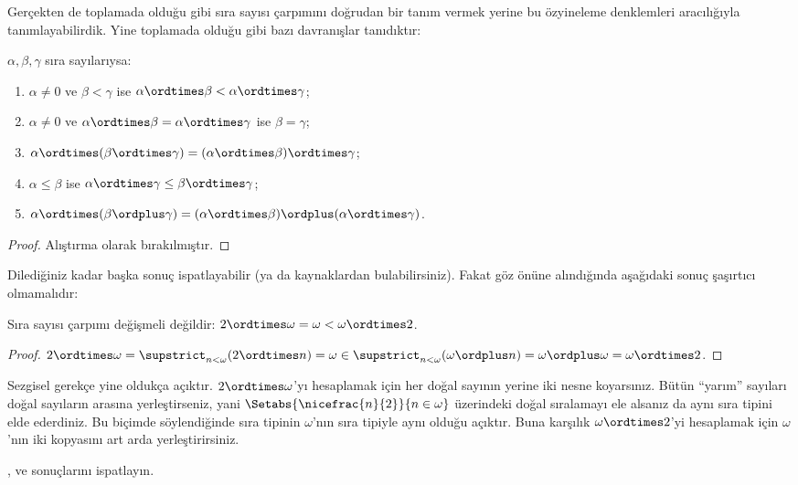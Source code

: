 Gerçekten de toplamada olduğu gibi sıra sayısı çarpımını doğrudan bir tanım
vermek yerine bu özyineleme denklemleri aracılığıyla tanımlayabilirdik.
Yine toplamada olduğu gibi bazı davranışlar tanıdıktır:

\begin{lem}
$\alpha,\beta,\gamma$ sıra sayılarıysa:
\begin{enumerate}
	\item{} $\alpha\neq 0$ ve $\beta<\gamma$ ise
	$\alpha\ordtimes\beta<\alpha\ordtimes\gamma$;
	\item{} $\alpha\neq 0$ ve
	$\alpha\ordtimes\beta=\alpha\ordtimes\gamma$ ise $\beta=\gamma$;
	\item{} $\alpha\ordtimes(\beta\ordtimes\gamma)
	=(\alpha\ordtimes\beta)\ordtimes\gamma$;
	\item{} $\alpha\leq\beta$ ise
	$\alpha\ordtimes\gamma\leq\beta\ordtimes\gamma$;
	\item{} $\alpha\ordtimes(\beta\ordplus\gamma)
	=(\alpha\ordtimes\beta)\ordplus(\alpha\ordtimes\gamma)$.
\end{enumerate}
\end{lem}

\begin{proof}
Alıştırma olarak bırakılmıştır.
\end{proof}

Dilediğiniz kadar başka sonuç ispatlayabilir (ya da kaynaklardan
bulabilirsiniz). Fakat
 göz önüne alındığında aşağıdaki
sonuç şaşırtıcı olmamalıdır:

\begin{prop}
Sıra sayısı çarpımı değişmeli değildir:
$2\ordtimes\omega=\omega<\omega\ordtimes 2$.
\end{prop}

\begin{proof}
$2\ordtimes\omega=\supstrict_{n<\omega}(2\ordtimes n)=\omega
\in\supstrict_{n<\omega}(\omega\ordplus n)=\omega\ordplus\omega
=\omega\ordtimes 2$.
\end{proof}
\noindent
Sezgisel gerekçe yine oldukça açıktır. $2\ordtimes\omega$'yı hesaplamak için
her doğal sayının yerine iki nesne koyarsınız. Bütün ``yarım'' sayıları doğal
sayıların arasına yerleştirseniz, yani
$\Setabs{\nicefrac{n}{2}}{n\in\omega}$ üzerindeki doğal sıralamayı ele
alsanız da aynı sıra tipini elde ederdiniz. Bu biçimde söylendiğinde sıra
tipinin $\omega$'nın sıra tipiyle aynı olduğu açıktır. Buna karşılık
$\omega\ordtimes 2$'yi hesaplamak için $\omega$'nın iki kopyasını art arda
yerleştirirsiniz.

\begin{prob}
,
 ve
 sonuçlarını
ispatlayın.
\end{prob}

